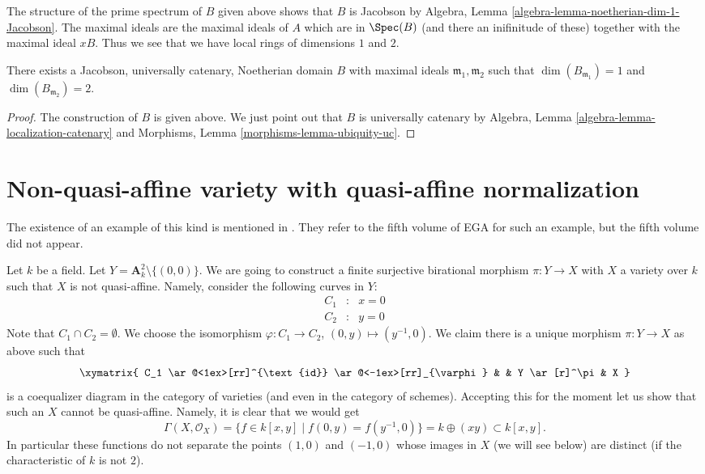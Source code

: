 \medskip\noindent
The structure of the prime spectrum of $B$ given above
shows that $B$ is Jacobson by
Algebra, Lemma \ref{algebra-lemma-noetherian-dim-1-Jacobson}.
The maximal ideals are the maximal ideals of $A$
which are in $\Spec(B)$ (and there an inifinitude of these)
together with the maximal ideal $xB$. Thus we see that we have
local rings of dimensions $1$ and $2$.

\begin{lemma}
\label{lemma-Noetherian-Jacobson}
There exists a Jacobson, universally catenary, Noetherian domain $B$
with maximal ideals $\mathfrak m_1, \mathfrak m_2$ such that
$\dim(B_{\mathfrak m_1}) = 1$ and $\dim(B_{\mathfrak m_2}) = 2$.
\end{lemma}

\begin{proof}
The construction of $B$ is given above. We just point out that
$B$ is universally catenary by
Algebra, Lemma \ref{algebra-lemma-localization-catenary} and
Morphisms, Lemma \ref{morphisms-lemma-ubiquity-uc}.
\end{proof}




\section{Non-quasi-affine variety with quasi-affine normalization}
\label{section-nonquasi-affine}

\noindent
The existence of an example of this kind is mentioned in
\cite[II Remark 6.6.13]{EGA}. They refer to the fifth volume of
EGA for such an example, but the fifth volume did not appear.

\medskip\noindent
Let $k$ be a field.
Let $Y = \mathbf{A}^2_k \setminus \{(0, 0)\}$.
We are going to construct a finite surjective birational morphism
$\pi : Y \longrightarrow X$
with $X$ a variety over $k$ such that $X$ is not quasi-affine.
Namely, consider the following curves in $Y$:
$$
\begin{matrix}
C_1 & : & x = 0 \\
C_2 & : & y = 0
\end{matrix}
$$
Note that $C_1 \cap C_2 = \emptyset$. We choose the isomorphism
$\varphi : C_1 \to C_2$, $(0, y) \mapsto (y^{-1}, 0)$.
We claim there is a unique morphism $\pi : Y \to X$ as above
such that
$$
\xymatrix{
C_1
\ar@<1ex>[rr]^{\text{id}} \ar@<-1ex>[rr]_{\varphi}
& &
Y \ar[r]^\pi & X
}
$$
is a coequalizer diagram in the category of varieties (and even in
the category of schemes). Accepting this for the moment let us
show that such an $X$ cannot be quasi-affine. Namely, it is clear
that we would get
$$
\Gamma(X, \mathcal{O}_X) =
\{ f \in k[x, y] \mid f(0, y) = f(y^{-1}, 0)\} =
k \oplus (xy) \subset k[x, y].
$$
In particular these functions do not separate the points $(1, 0)$
and $(-1, 0)$ whose images in $X$ (we will see below) are distinct
(if the characteristic of $k$ is not $2$).

